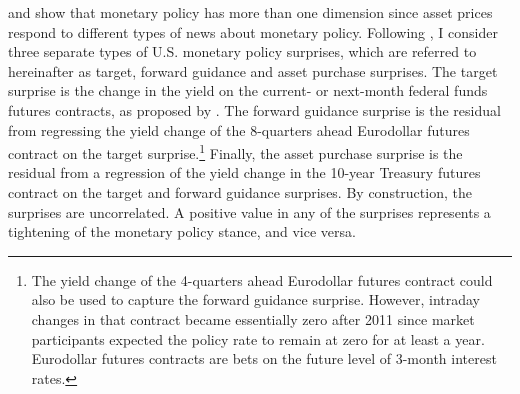 {\cite{GSS:2005a} and \cite{Swanson:2018} show that monetary policy has more than one dimension since asset prices respond to different types of news about monetary policy.
Following \cite{RogersScottiWright:2018}, I consider three separate types of U.S. monetary policy surprises,
which are referred to hereinafter as target, forward guidance and asset purchase surprises.
The target surprise is the change in the yield on the current- or next-month federal funds futures contracts, as proposed by \cite{Kuttner:2001}.
The forward guidance surprise is the residual from regressing the yield change of the 8-quarters ahead Eurodollar futures contract on the target surprise.\footnote{ The yield change of the 4-quarters ahead Eurodollar futures contract could also be used to capture the forward guidance surprise. However, intraday changes in that contract became essentially zero after 2011 since market participants expected the policy rate to remain at zero for at least a year. Eurodollar futures contracts are bets on the future level of 3-month interest rates.}
Finally, %
the asset purchase surprise is the residual from a regression of the yield change in the 10-year Treasury futures contract on the target and forward guidance surprises.
By construction, the surprises are uncorrelated.
A positive value in any of the surprises represents a tightening of the monetary policy stance, and vice versa.

}
